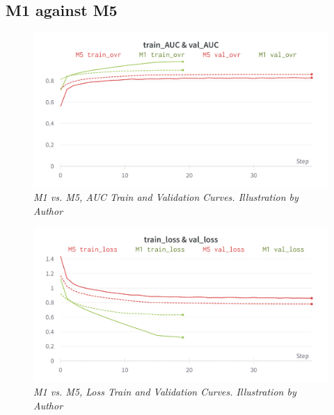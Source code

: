 \newpage


\subsection{M1 against M5}

\begin{figure}[H]
  \centering
  \includegraphics[width=\textwidth]{imatges/results/AUCM1M5.png}
  \caption[M1 vs. M5, AUC Train and Validation Curves]{\textit{M1 vs. M5, AUC Train and Validation Curves. Illustration by Author}}
\end{figure}


\begin{figure}[H]
  \centering
  \includegraphics[width=\textwidth]{imatges/results/LossM1M5.png}
  \caption[M1 vs. M5, Loss Train and Validation Curves]{\textit{M1 vs. M5, Loss Train and Validation Curves. Illustration by Author}}
\end{figure}

\newpage


